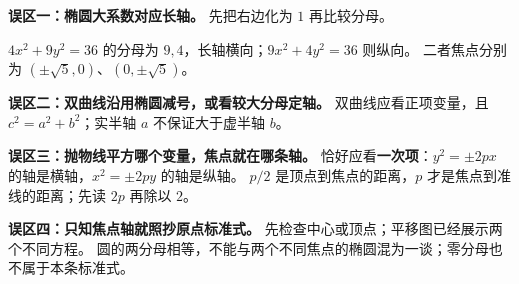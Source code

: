 \begin{trapbox}
\textbf{误区一：椭圆大系数对应长轴。} 先把右边化为 $1$ 再比较分母。

$4x^2+9y^2=36$ 的分母为 $9,4$，长轴横向；$9x^2+4y^2=36$ 则纵向。
二者焦点分别为 $(\pm\sqrt5,0)$、$(0,\pm\sqrt5)$。

\medskip
\textbf{误区二：双曲线沿用椭圆减号，或看较大分母定轴。}
双曲线应看正项变量，且 $c^2=a^2+b^2$；实半轴 $a$ 不保证大于虚半轴 $b$。

\medskip
\textbf{误区三：抛物线平方哪个变量，焦点就在哪条轴。}
恰好应看\textbf{一次项}：$y^2=\pm2px$ 的轴是横轴，$x^2=\pm2py$ 的轴是纵轴。
$p/2$ 是顶点到焦点的距离，$p$ 才是焦点到准线的距离；先读 $2p$ 再除以 $2$。

\medskip
\textbf{误区四：只知焦点轴就照抄原点标准式。}
先检查中心或顶点；平移图已经展示两个不同方程。
圆的两分母相等，不能与两个不同焦点的椭圆混为一谈；零分母也不属于本条标准式。
\end{trapbox}
